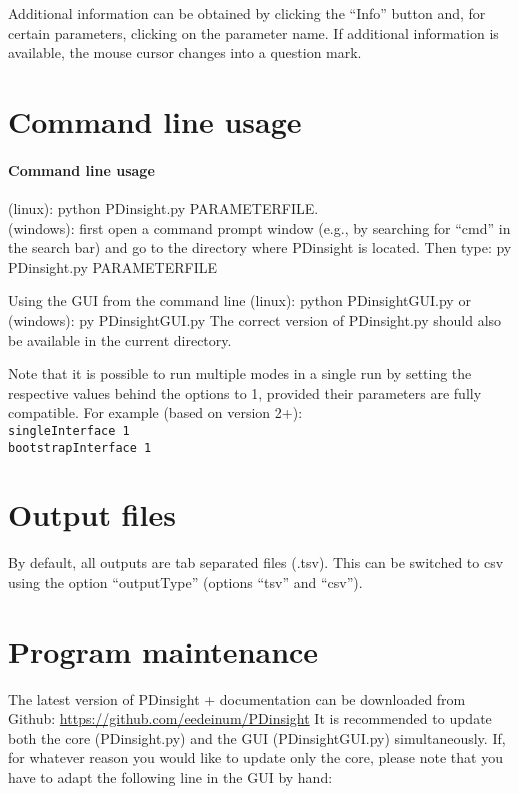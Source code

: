 \documentclass[a4paper,12pt]{article}
\begin{document}
Additional information can be obtained by clicking the ``Info'' button and, for certain parameters, clicking on the parameter name. If additional information is available, the mouse cursor changes into a question mark.

\section{Command line usage}
\paragraph{Command line usage} (linux): python PDinsight.py PARAMETERFILE. \\
(windows): first open a command prompt window (e.g., by searching for ``cmd'' in the search bar) and go to the directory where PDinsight is located. Then type: py PDinsight.py PARAMETERFILE

Using the GUI from the command line (linux): python PDinsightGUI.py or (windows): py PDinsightGUI.py 
The correct version of PDinsight.py should also be available in the current directory.


Note that it is possible to run multiple modes in a single run by setting the respective values behind the options to 1, provided their parameters are fully compatible. For example (based on version 2+): \\
\texttt{singleInterface  1}\\
\texttt{bootstrapInterface  1}\\

\section{Output files}
By default, all outputs are tab separated files (.tsv). This can be switched to csv using the option ``outputType'' (options ``tsv'' and ``csv'').

\section{Program maintenance}
The latest version of PDinsight + documentation can be downloaded from Github: \url{https://github.com/eedeinum/PDinsight}
It is recommended to update both the core (PDinsight.py) and the GUI (PDinsightGUI.py) simultaneously. If, for whatever reason you would like to update only the core, please note that you have to adapt the following line in the GUI by hand:
\end{document}
